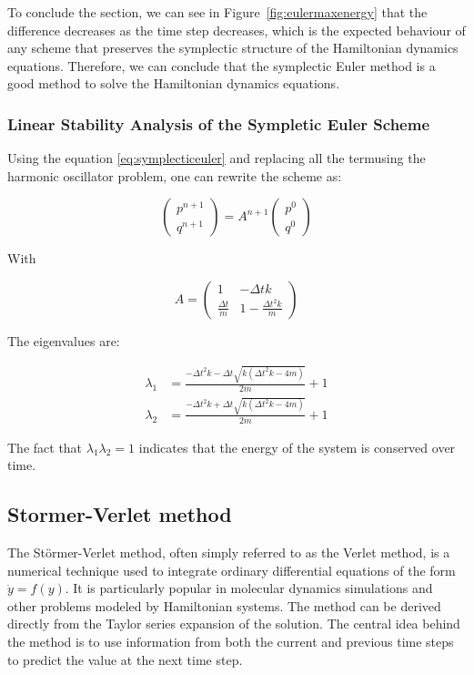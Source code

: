 \documentclass{report}
\begin{document}
To conclude the section, we can see in Figure~\ref*{fig:eulermaxenergy} that the difference decreases as the time step decreases, which is the expected behaviour of any scheme that preserves the symplectic structure of the Hamiltonian dynamics equations. Therefore, we can conclude that the symplectic Euler method is a good method to solve the Hamiltonian dynamics equations.

\subsubsection{Linear Stability Analysis of the Sympletic Euler Scheme}
\label{sec:linear_stability_symplectic_euler}

Using the equation \ref{eq:symplecticeuler} and replacing all the termusing the harmonic oscillator problem, one can rewrite the scheme as:

\[
	\begin{pmatrix} p^{n+1} \\ q^{n+1} \end{pmatrix} = A^{n+1} \begin{pmatrix} p^{0} \\ q^{0} \end{pmatrix}
\]

With

\[
	A = \begin{pmatrix} 1 & -\Delta t k \\ \frac{\Delta t}{m} & 1 -  \frac{\Delta t^2 k}{m} \end{pmatrix}
\]

The eigenvalues are:

\begin{align*}
	\lambda_1 &= \frac{-\Delta t^2 k - \Delta t \sqrt{k(\Delta t^2 k - 4m)}}{2m} + 1 \\
	\lambda_2 &= \frac{-\Delta t^2 k + \Delta t \sqrt{k(\Delta t^2 k - 4m)}}{2m} + 1
\end{align*}

The fact that \(\lambda_1 \lambda_2 = 1\) indicates that the energy of the system is conserved over time.

\subsection{Stormer-Verlet method}
\label{sec:stormer_verlet_method}

The Störmer-Verlet method, often simply referred to as the Verlet method, is a numerical technique used to integrate ordinary differential equations of the form \( \dot{y} = f(y) \). It is particularly popular in molecular dynamics simulations and other problems modeled by Hamiltonian systems. The method can be derived directly from the Taylor series expansion of the solution. The central idea behind the method is to use information from both the current and previous time steps to predict the value at the next time step. 
\end{document}
